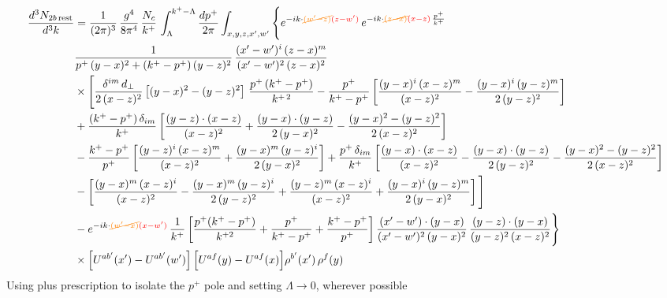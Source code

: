 \documentclass[9pt]{article}
\numberwithin{equation}{section}
\begin{document}
\begin{align}
\frac{d^{3}N_{2b\,\rm rest}}{d^{3}k}&=\frac{1}{(2\pi)^{3}}\,\frac{g^{4}}{8\pi^{4}}\,\frac{N_{c}}{k^{+}}\,\int_{\Lambda}^{k^{+}-\Lambda}\frac{dp^{+}}{2\pi}\int_{x,y,z,x',w'}\Bigg\{e^{-ik\cdot{\color{orange}\cancel{(w'-z)}}{\color{red}(z-w')}}\,e^{-ik\cdot{\color{orange}\cancel{(z-x)}}{\color{red}(x-z)}\,\frac{p^{+}}{k^{+}}}\,\notag \\ & \frac{1}{p^{+}\,(y-x)^{2}+(k^{+}-p^{+})\,(y-z)^{2}}\,\frac{(x'-w')^{i}\,(z-x)^{m}}{(x'-w')^{2}\,(z-x)^{2}}\notag\\
&\times\Bigg[\frac{\delta^{im}\,d_{\perp}}{2\,(x-z)^{2}}\left[(y-x)^{2}-(y-z)^{2}\right]\,\frac{p^{+}\,(k^{+}-p^{+})}{k^{+\,2}}-\frac{p^{+}}{k^{+}-p^{+}}\left[\frac{(y-x)^{i}\,(x-z)^{m}}{(x-z)^{2}}-\frac{(y-x)^{i}\,(y-z)^{m}}{2\,(y-z)^{2}}\right]\notag\\
&+\frac{(k^{+}-p^{+})\,\delta_{im}}{k^{+}}\left[\frac{(y-z)\cdot(x-z)}{(x-z)^{2}}+\frac{(y-x)\cdot(y-z)}{2\,(y-x)^{2}}-\frac{(y-x)^{2}-(y-z)^{2}}{2\,(x-z)^{2}}\right]
\notag \\ & -\frac{k^{+}-p^{+}}{p^{+}}\left[\frac{(y-z)^{i}\,(x-z)^{m}}{(x-z)^{2}}+\frac{(y-x)^{m}\,(y-z)^{i}}{2\,(y-x)^{2}}\right]+\frac{p^{+}\,\delta_{im}}{k^{+}}\left[\frac{(y-x)\cdot(x-z)}{(x-z)^{2}}-\frac{(y-x)\cdot(y-z)}{2\,(y-z)^{2}}-\frac{(y-x)^{2}-(y-z)^{2}}{2\,(x-z)^{2}}\right]\notag\\
&-\left[\frac{(y-x)^{m}\,(x-z)^{i}}{(x-z)^{2}}-\frac{(y-x)^{m}\,(y-z)^{i}}{2\,(y-z)^{2}}+\frac{(y-z)^{m}\,(x-z)^{i}}{(x-z)^{2}}+\frac{(y-x)^{i}\,(y-z)^{m}}{2\,(y-x)^{2}}\right]\Bigg]\notag\\
&-e^{-ik\cdot{\color{orange}\cancel{(w'-x)}}{\color{red}(x-w')}}\,\frac{1}{k^{+}}\left[\frac{p^{+}(k^{+}-p^{+})}{k^{+2}}+\frac{p^{+}}{k^{+}-p^{+}}+\frac{k^{+}-p^{+}}{p^{+}}\right]\frac{(x'-w')\cdot(y-x)}{(x'-w')^{2}\,(y-x)^{2}}\,\frac{(y-z)\cdot(y-x)}{(y-z)^{2}\,(x-z)^{2}}\Bigg\}\notag\\
&\times\Big[U^{ab'}(x')-U^{ab'}(w')\Big]\,\Big[U^{af}(y)-U^{af}(x)\Big]\rho^{b'}(x')\,\rho^{f}(y)
\end{align}
Using plus prescription to isolate the $p^{+}$ pole and setting $\Lambda\to 0$, wherever possible
\end{document}
